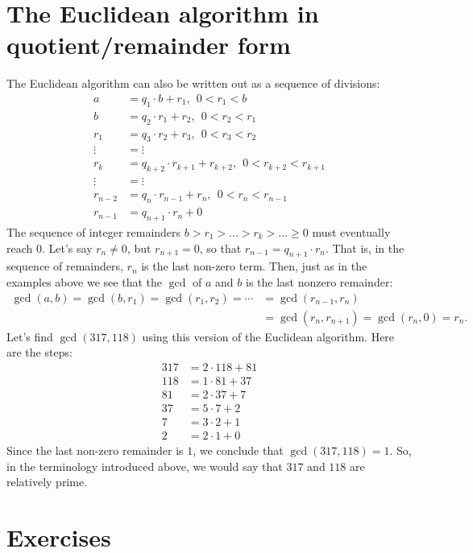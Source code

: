 \section{The Euclidean algorithm in quotient/remainder form}
The Euclidean algorithm can also be written out as a sequence of divisions: 
\begin{align*}
 a &= q_1\cdot b + r_1, ~~0< r_1 < b \\
 b &= q_2\cdot r_1 + r_2, ~~0< r_2 < r_1 \\
 r_1 &= q_3\cdot r_2 + r_3, ~~0< r_3 < r_2 \\
 \vdots & = \vdots  \\
 r_k &= q_{k+2}\cdot r_{k+1} + r_{k+2}, ~~0< r_{k+2} < r_{k+1} \\
 \vdots & = \vdots  \\
 r_{n-2} &= q_n\cdot r_{n-1} + r_n, ~~0< r_n < r_{n-1} \\
 r_{n-1} &= q_{n+1}\cdot r_n + 0
\end{align*}
The sequence of integer remainders $b>r_1>...>r_k>...\geq 0$ must eventually reach $0$. 
Let's say $r_n\not=0$, but $r_{n+1}=0$, so that $r_{n-1}=q_{n+1}\cdot r_n$. 
That is, in the sequence of remainders, $r_n$ is the last non-zero term. 
Then, just as in the examples above we see that the $\gcd$ of $a$ and $b$ is the last nonzero
remainder:
\begin{align*}
 \gcd(a,b) = \gcd(b,r_1) = \gcd(r_1,r_2) =\cdots&= \gcd(r_{n-1},r_n) \\
 & = \gcd(r_n,r_{n+1})
 = \gcd(r_n,0) = r_n.
\end{align*}
Let's find $\gcd(317,118)$ using this version of the Euclidean algorithm.  Here are the
steps:
\begin{align*}
 317 &= 2\cdot118+81 \\
 118 &= 1\cdot81+37\\
  81 &= 2\cdot37+7\\
  37 &= 5\cdot7+2 \\
  7  &= 3\cdot2+1 \\
  2  &= 2\cdot1+0
\end{align*}
Since the last non{-}zero remainder is $1$, we conclude that
$\gcd(317,118)=1$. So, in the terminology introduced above, we would say that
$317$ and $118$ are relatively prime.




\clearpage

\section{Exercises}

